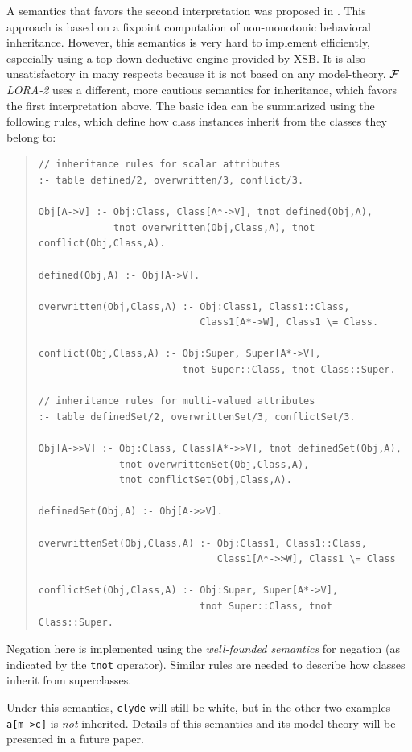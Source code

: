 \documentclass[11pt]{article}
\newcommand{\FLORA}{{\mbox{${\cal F}${\small\it LORA}\rm\emph{-2}}}\xspace}
\begin{document}
A semantics that favors the second interpretation was proposed in
\cite{KLW95}. This approach is based on a fixpoint computation of
non-monotonic behavioral inheritance.  However, this semantics is very hard
to implement efficiently, especially using a top-down deductive engine
provided by XSB. It is also unsatisfactory in many respects because it is
not based on any model-theory. \FLORA uses a different, more cautious
semantics for inheritance, which favors the first interpretation above.
The basic idea can be summarized using the following rules, which define how
class instances inherit from the classes they belong to:
\begin{quote}
\begin{verbatim}
// inheritance rules for scalar attributes
:- table defined/2, overwritten/3, conflict/3.

Obj[A->V] :- Obj:Class, Class[A*->V], tnot defined(Obj,A),
             tnot overwritten(Obj,Class,A), tnot conflict(Obj,Class,A).

defined(Obj,A) :- Obj[A->V].

overwritten(Obj,Class,A) :- Obj:Class1, Class1::Class,
                            Class1[A*->W], Class1 \= Class.

conflict(Obj,Class,A) :- Obj:Super, Super[A*->V],
                         tnot Super::Class, tnot Class::Super.

// inheritance rules for multi-valued attributes
:- table definedSet/2, overwrittenSet/3, conflictSet/3.

Obj[A->>V] :- Obj:Class, Class[A*->>V], tnot definedSet(Obj,A),
              tnot overwrittenSet(Obj,Class,A),
              tnot conflictSet(Obj,Class,A).

definedSet(Obj,A) :- Obj[A->>V].

overwrittenSet(Obj,Class,A) :- Obj:Class1, Class1::Class,
                               Class1[A*->>W], Class1 \= Class

conflictSet(Obj,Class,A) :- Obj:Super, Super[A*->V],
                            tnot Super::Class, tnot Class::Super.
\end{verbatim}
\end{quote}
Negation here is implemented using the {\em well-founded semantics}
for negation \cite{gelder-alternating-89,gelder-ross-schlipf-91} (as
indicated by the {\tt tnot} operator).  Similar rules are needed to
describe how classes inherit from superclasses.

Under this semantics, {\tt clyde} will still be white, but in the other two
examples {\tt a[m->c]} is \emph{not} inherited. Details of this semantics
and its model theory will be presented in a future paper.
\end{document}
